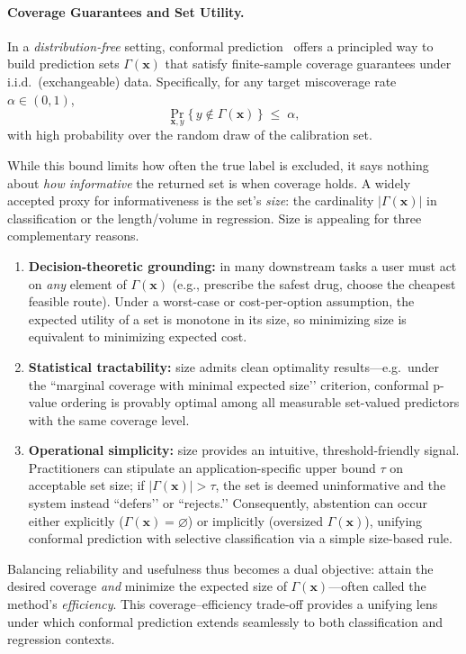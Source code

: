 \paragraph{Coverage Guarantees and Set Utility.}
In a \emph{distribution-free} setting, conformal prediction~\citep{angelopoulos2021gentle} offers a principled way to build prediction sets $\Gamma(\bm{x})$ that satisfy finite-sample coverage guarantees under i.i.d.\ (exchangeable) data. Specifically, for any target miscoverage rate $\alpha\in(0,1)$,
\begin{equation}
  \Pr_{\bm{x},y}\!\bigl\{\,y\notin\Gamma(\bm{x})\,\bigr\}\;\le\;\alpha,
\end{equation}
with high probability over the random draw of the calibration set.  

While this bound limits how often the true label is excluded, it says nothing about \emph{how informative} the returned set is when coverage holds.  A widely accepted proxy for informativeness is the set’s \emph{size}: the cardinality $\lvert\Gamma(\bm{x})\rvert$ in classification or the length/volume in regression.  Size is appealing for three complementary reasons. 
\begin{enumerate}
    \item \textbf{Decision-theoretic grounding:} in many downstream tasks a user must act on \emph{any} element of $\Gamma(\bm{x})$ (e.g., prescribe the safest drug, choose the cheapest feasible route).  Under a worst-case or cost-per-option assumption, the expected utility of a set is monotone in its size, so minimizing size is equivalent to minimizing expected cost. 
    \item \textbf{Statistical tractability:} size admits clean optimality results—e.g.\ under the “marginal coverage with minimal expected size’’ criterion, conformal p-value ordering is provably optimal among all measurable set-valued predictors with the same coverage level.
    \item \textbf{Operational simplicity:} size provides an intuitive, threshold-friendly signal.  Practitioners can stipulate an application-specific upper bound $\tau$ on acceptable set size; if $\lvert\Gamma(\bm{x})\rvert>\tau$, the set is deemed uninformative and the system instead “defers’’ or “rejects.’’  Consequently, abstention can occur either explicitly ($\Gamma(\bm{x})=\varnothing$) or implicitly (oversized $\Gamma(\bm{x})$), unifying conformal prediction with selective classification via a simple size-based rule.
\end{enumerate}  
Balancing reliability and usefulness thus becomes a dual objective: attain the desired coverage \emph{and} minimize the expected size of $\Gamma(\bm{x})$—often called the method’s \emph{efficiency}.  This coverage–efficiency trade-off provides a unifying lens under which conformal prediction extends seamlessly to both classification and regression contexts.


